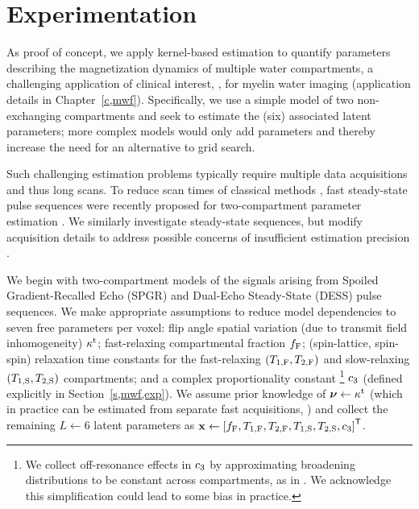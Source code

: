 \section{Experimentation}
\label{s,krr,exp}

As proof of concept, 
we apply kernel-based estimation 
to quantify parameters describing 
the magnetization dynamics of multiple water compartments,
a challenging application of clinical interest,
\eg, for myelin water imaging 
(application details in Chapter~\ref{c,mwf}).
Specifically,
we use a simple model of two non-exchanging compartments
and seek to estimate the (six) associated latent parameters;
more complex models would only add parameters
and thereby increase the need for an alternative to grid search.

Such challenging estimation problems
typically require multiple data acquisitions
and thus long scans.
To reduce scan times
of classical methods
\cite{mackay:94:ivv},
fast steady-state pulse sequences
were recently proposed 
for two-compartment parameter estimation
\cite{deoni:08:gmt, deoni:11:com}.
We similarly investigate steady-state sequences,
but modify acquisition details
to address possible concerns
of insufficient estimation precision
\cite{lankford:13:oti}.

We begin with two-compartment models
of the signals arising from
Spoiled Gradient-Recalled Echo (SPGR)
\cite{zur:91:sot}
and Dual-Echo Steady-State (DESS) 
\cite{bruder:88:ans}
pulse sequences.
We make appropriate assumptions 
to reduce model dependencies
to seven free parameters per voxel:
flip angle spatial variation 
(due to transmit field inhomogeneity) $\kappa^{\mathrm{t}}$;
fast-relaxing compartmental fraction $f_{\mathrm{F}}$;
(spin-lattice, spin-spin) relaxation time constants 
for the fast-relaxing $\paren{\tf{1},\tf{2}}$
and slow-relaxing $\paren{\ts{1},\ts{2}}$ compartments;
and a complex proportionality constant
\footnote{We collect off-resonance effects in $c_{3}$
by approximating broadening distributions
to be constant across compartments,
as in \cite{deoni:08:gmt, deoni:11:com}.
We acknowledge this simplification
could lead to some bias in practice.}
$c_{3}$ 
(defined explicitly in Section~\ref{s,mwf,exp}).
We assume prior knowledge of $\boldsymbol{\nu} \gets \kappa^{\mathrm{t}}$ 
(which in practice can be estimated
from separate fast acquisitions, 
\eg \cite{sacolick:10:bmb})
and collect the remaining $L \gets 6$ latent parameters as
$\bmx \gets \brac{\ff,\tf{1},\tf{2},\ts{1},\ts{2},\const{3}}\tpose$.

